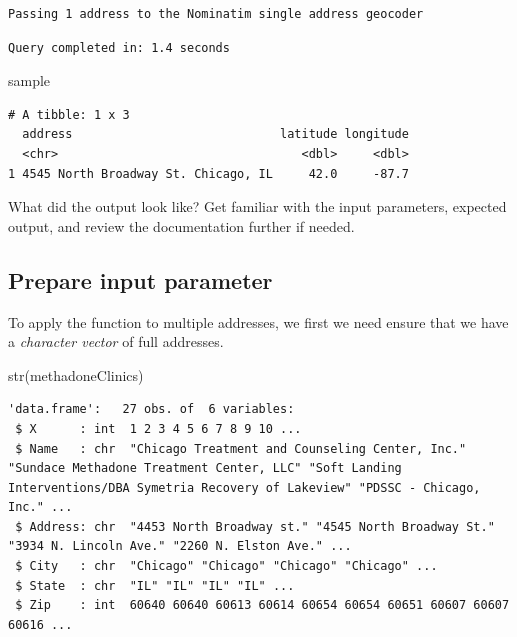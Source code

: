 \documentclass[
  letterpaper,
  DIV=11,
  numbers=noendperiod]{scrreprt}
\newenvironment{Shaded}{\begin{snugshade}}{\end{snugshade}}
\newcommand{\FunctionTok}[1]{\textcolor[rgb]{0.28,0.35,0.67}{#1}}
\newcommand{\NormalTok}[1]{\textcolor[rgb]{0.00,0.23,0.31}{#1}}
\begin{document}
\begin{verbatim}
Passing 1 address to the Nominatim single address geocoder
\end{verbatim}

\begin{verbatim}
Query completed in: 1.4 seconds
\end{verbatim}

\begin{Shaded}
\begin{Highlighting}[]
\NormalTok{sample}
\end{Highlighting}
\end{Shaded}

\begin{verbatim}
# A tibble: 1 x 3
  address                             latitude longitude
  <chr>                                  <dbl>     <dbl>
1 4545 North Broadway St. Chicago, IL     42.0     -87.7
\end{verbatim}

What did the output look like? Get familiar with the input parameters,
expected output, and review the documentation further if needed.

\subsection{Prepare input parameter}\label{prepare-input-parameter}

To apply the function to multiple addresses, we first we need ensure
that we have a \emph{character vector} of full addresses.

\begin{Shaded}
\begin{Highlighting}[]
\FunctionTok{str}\NormalTok{(methadoneClinics)}
\end{Highlighting}
\end{Shaded}

\begin{verbatim}
'data.frame':   27 obs. of  6 variables:
 $ X      : int  1 2 3 4 5 6 7 8 9 10 ...
 $ Name   : chr  "Chicago Treatment and Counseling Center, Inc." "Sundace Methadone Treatment Center, LLC" "Soft Landing Interventions/DBA Symetria Recovery of Lakeview" "PDSSC - Chicago, Inc." ...
 $ Address: chr  "4453 North Broadway st." "4545 North Broadway St." "3934 N. Lincoln Ave." "2260 N. Elston Ave." ...
 $ City   : chr  "Chicago" "Chicago" "Chicago" "Chicago" ...
 $ State  : chr  "IL" "IL" "IL" "IL" ...
 $ Zip    : int  60640 60640 60613 60614 60654 60654 60651 60607 60607 60616 ...
\end{verbatim}
\end{document}

